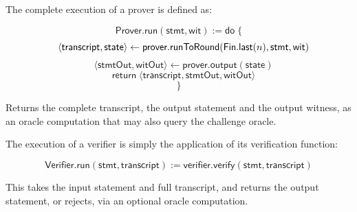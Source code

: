 \begin{definition}
    \label{def:prover_run}
    The complete execution of a prover is defined as:

    \begin{equation*} \mathsf{Prover}.\mathsf{run}(\mathsf{stmt}, \mathsf{wit}) := \mathsf{do} \; \{ \end{equation*}
    \begin{equation*} \quad \langle \mathsf{transcript}, \mathsf{state} \rangle \leftarrow \mathsf{prover}.\mathsf{runToRound}(\mathsf{Fin}.\mathsf{last}(n), \mathsf{stmt}, \mathsf{wit}) \end{equation*}
    \begin{equation*} \quad \langle \mathsf{stmtOut}, \mathsf{witOut} \rangle \leftarrow \mathsf{prover}.\mathsf{output}(\mathsf{state}) \end{equation*}
    \begin{equation*} \quad \mathsf{return} \; \langle \mathsf{transcript}, \mathsf{stmtOut}, \mathsf{witOut} \rangle \end{equation*}
    \begin{equation*} \} \end{equation*}

    Returns the complete transcript, the output statement and the output witness, as an oracle
    computation that may also query the challenge oracle.
    \leanok
\end{definition}

\begin{definition}
    \label{def:verifier_run}
    The execution of a verifier is simply the application of its verification function:

    \begin{equation*} \mathsf{Verifier}.\mathsf{run}(\mathsf{stmt}, \mathsf{transcript}) := \mathsf{verifier}.\mathsf{verify}(\mathsf{stmt}, \mathsf{transcript}) \end{equation*}

    This takes the input statement and full transcript, and returns the output statement, or
    rejects, via an optional oracle computation.
    \leanok
\end{definition}

